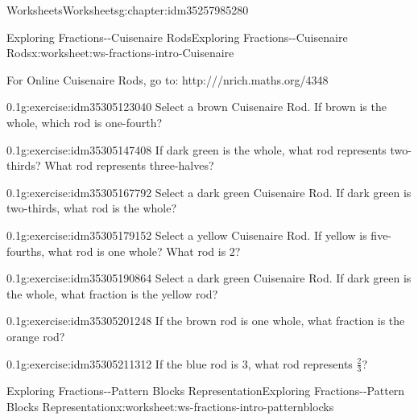 \documentclass[twoside,11pt,]{book}
\begin{document}
\begin{chapterptx}{Worksheets}{}{Worksheets}{}{}{g:chapter:idm35257985280}
\begin{worksheet-section-numberless}{Exploring Fractions-{}-{}Cuisenaire Rods}{}{Exploring Fractions-{}-{}Cuisenaire Rods}{}{}{x:worksheet:ws-fractions-intro-Cuisenaire}
\begin{introduction}{}%
For Online Cuisenaire Rods, go to: http:\slash{}\slash{}\slash{}nrich.maths.org\slash{}4348%
\end{introduction}%
\begin{divisionexercise}{1}{}{0.1}{g:exercise:idm35305123040}%
Select a brown Cuisenaire Rod.  If brown is the whole, which rod is one-fourth?%
\end{divisionexercise}%
\begin{divisionexercise}{2}{}{0.1}{g:exercise:idm35305147408}%
If dark green is the whole, what rod represents two-thirds? What rod represents three-halves?%
\end{divisionexercise}%
\begin{divisionexercise}{3}{}{0.1}{g:exercise:idm35305167792}%
Select a dark green Cuisenaire Rod.  If dark green is two-thirds, what rod is the whole?%
\end{divisionexercise}%
\begin{divisionexercise}{4}{}{0.1}{g:exercise:idm35305179152}%
Select a yellow Cuisenaire Rod.  If yellow is five-fourths, what rod is one whole? What rod is 2?%
\end{divisionexercise}%
\begin{divisionexercise}{5}{}{0.1}{g:exercise:idm35305190864}%
Select a dark green Cuisenaire Rod.  If dark green is the whole, what fraction is the yellow rod?%
\end{divisionexercise}%
\begin{divisionexercise}{6}{}{0.1}{g:exercise:idm35305201248}%
If the brown rod is one whole, what fraction is the orange rod?%
\end{divisionexercise}%
\begin{divisionexercise}{7}{}{0.1}{g:exercise:idm35305211312}%
If the blue rod is 3, what rod represents \(\frac{2}{3} \)?%
\end{divisionexercise}%
\end{worksheet-section-numberless}
\restoregeometry
%
%
\typeout{************************************************}
\typeout{************************************************}
%
\begin{worksheet-section-numberless}{Exploring Fractions-{}-{}Pattern Blocks Representation}{}{Exploring Fractions-{}-{}Pattern Blocks Representation}{}{}{x:worksheet:ws-fractions-intro-patternblocks}
\begin{introduction}{}%

\end{introduction}
\end{worksheet-section-numberless}
\end{chapterptx}
\end{document}
